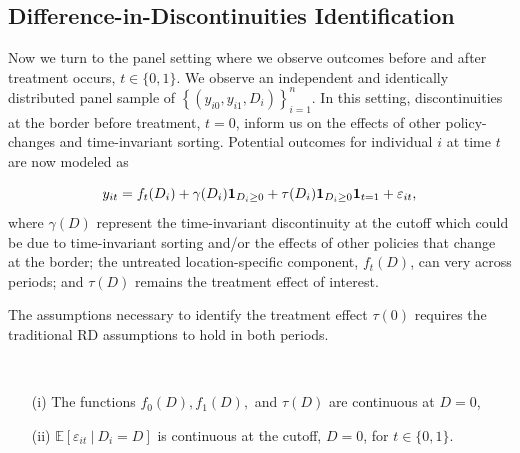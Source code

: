\documentclass[12pt]{article}
\begin{document}
\subsection{Difference-in-Discontinuities Identification}

Now we turn to the panel setting where we observe outcomes before and after treatment occurs, $t \in \{0,1\}$. We observe an independent and identically distributed panel sample of $\left\{ (y_{i0}, y_{i1}, D_i) \right\}_{i=1}^n$. In this setting, discontinuities at the border before treatment, $t = 0$, inform us on the effects of other policy-changes and time-invariant sorting. Potential outcomes for individual $i$ at time $t$ are now modeled as 

\begin{equation}\label{eq:panel_model}
    y_{it} = f_t(D_i) + \gamma(D_i) \mathbf{1}_{D_i \geq 0} + \tau(D_i) \mathbf{1}_{D_i \geq 0} \mathbf{1}_{t = 1} + \varepsilon_{it},
\end{equation}
where $\gamma(D)$ represent the time-invariant discontinuity at the cutoff which could be due to time-invariant sorting and/or the effects of other policies that change at the border; the untreated location-specific component, $f_t(D)$, can very across periods; and $\tau(D)$ remains the treatment effect of interest. 

The assumptions necessary to identify the treatment effect $\tau(0)$ requires the traditional RD assumptions to hold in both periods.

\begin{assumption}\label{eq:continuity_panel}\ \\\vspace{-10mm} 
    \begin{itemize}
        \item[(i)] The functions $f_0(D), f_1(D),$ and $\tau(D)$ are continuous at $D = 0$, 
        \item[(ii)] $\mathbb{E}\left[ \varepsilon_{it} \ \vert \ D_i = D \right]$ is continuous at the cutoff, $D = 0$, for $t \in \{0, 1\}$. 
    \end{itemize}
\end{assumption}
\end{document}
